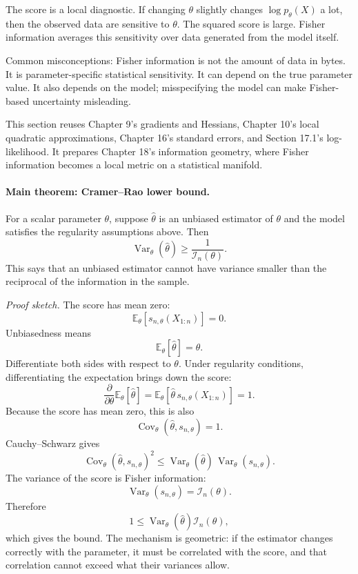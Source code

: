 The score is a local diagnostic. If changing \(\theta\) slightly changes \(\log p_\theta(X)\) a lot, then the observed data are sensitive to \(\theta\). The squared score is large. Fisher information averages this sensitivity over data generated from the model itself.

Common misconceptions: Fisher information is not the amount of data in bytes. It is parameter-specific statistical sensitivity. It can depend on the true parameter value. It also depends on the model; misspecifying the model can make Fisher-based uncertainty misleading.

This section reuses Chapter 9's gradients and Hessians, Chapter 10's local quadratic approximations, Chapter 16's standard errors, and Section 17.1's log-likelihood. It prepares Chapter 18's information geometry, where Fisher information becomes a local metric on a statistical manifold.

\paragraph{Main theorem: Cramer--Rao lower bound.}
For a scalar parameter \(\theta\), suppose \(\hat\theta\) is an unbiased estimator of \(\theta\) and the model satisfies the regularity assumptions above. Then
\[
\boxed{
\operatorname{Var}_\theta(\hat\theta)
\geq
\frac{1}{\mathcal I_n(\theta)}.
}
\]
This says that an unbiased estimator cannot have variance smaller than the reciprocal of the information in the sample.

\emph{Proof sketch.}
The score has mean zero:
\[
\mathbb E_\theta[s_{n,\theta}(X_{1:n})]=0.
\]
Unbiasedness means
\[
\mathbb E_\theta[\hat\theta]=\theta.
\]
Differentiate both sides with respect to \(\theta\). Under regularity conditions, differentiating the expectation brings down the score:
\[
\frac{\partial}{\partial\theta}\mathbb E_\theta[\hat\theta]
=
\mathbb E_\theta[\hat\theta\,s_{n,\theta}(X_{1:n})]
=1.
\]
Because the score has mean zero, this is also
\[
\operatorname{Cov}_\theta(\hat\theta,s_{n,\theta})=1.
\]
Cauchy--Schwarz gives
\[
\operatorname{Cov}_\theta(\hat\theta,s_{n,\theta})^2
\leq
\operatorname{Var}_\theta(\hat\theta)\,
\operatorname{Var}_\theta(s_{n,\theta}).
\]
The variance of the score is Fisher information:
\[
\operatorname{Var}_\theta(s_{n,\theta})=\mathcal I_n(\theta).
\]
Therefore
\[
1\leq \operatorname{Var}_\theta(\hat\theta)\mathcal I_n(\theta),
\]
which gives the bound. The mechanism is geometric: if the estimator changes correctly with the parameter, it must be correlated with the score, and that correlation cannot exceed what their variances allow.

